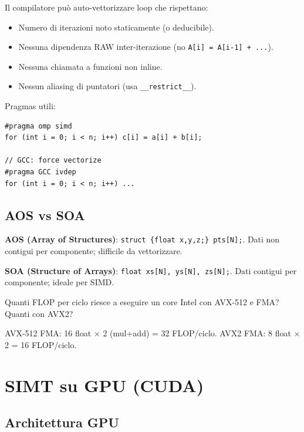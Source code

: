 \documentclass[11pt,a4paper]{article}
\theoremstyle{remark}
\newenvironment{esercizio}[1][]{%
  \begin{tcolorbox}[breakable,title={\textbf{Esercizio / Domanda d'esame}\ifx&#1&\else: #1\fi},
    colback=yellow!5!white, colframe=orange!75!black, fonttitle=\small\bfseries]%
}{%
  \end{tcolorbox}%
}
\newenvironment{risposta}{%
  \begin{tcolorbox}[breakable,title={\textbf{Risposta}},
    colback=green!5!white, colframe=green!50!black, fonttitle=\small\bfseries]%
}{%
  \end{tcolorbox}%
}
\begin{document}
Il compilatore può auto-vettorizzare loop che rispettano:
\begin{itemize}
  \item Numero di iterazioni noto staticamente (o deducibile).
  \item Nessuna dipendenza RAW inter-iterazione (no \texttt{A[i] = A[i-1] + ...}).
  \item Nessuna chiamata a funzioni non inline.
  \item Nessun aliasing di puntatori (usa \texttt{\_\_restrict\_\_}).
\end{itemize}

Pragmas utili:
\begin{lstlisting}
#pragma omp simd
for (int i = 0; i < n; i++) c[i] = a[i] + b[i];

// GCC: force vectorize
#pragma GCC ivdep
for (int i = 0; i < n; i++) ...
\end{lstlisting}

\subsection{AOS vs SOA}

\textbf{AOS (Array of Structures)}: \texttt{struct \{float x,y,z;\} pts[N];}. Dati non contigui per componente; difficile da vettorizzare.

\textbf{SOA (Structure of Arrays)}: \texttt{float xs[N], ys[N], zs[N];}. Dati contigui per componente; ideale per SIMD.

\begin{esercizio}
Quanti FLOP per ciclo riesce a eseguire un core Intel con AVX-512 e FMA? Quanti con AVX2?
\end{esercizio}
\begin{risposta}
AVX-512 FMA: 16 float $\times$ 2 (mul+add) = 32 FLOP/ciclo. AVX2 FMA: 8 float $\times$ 2 = 16 FLOP/ciclo.
\end{risposta}

\section{SIMT su GPU (CUDA)}

\subsection{Architettura GPU}
\end{document}
